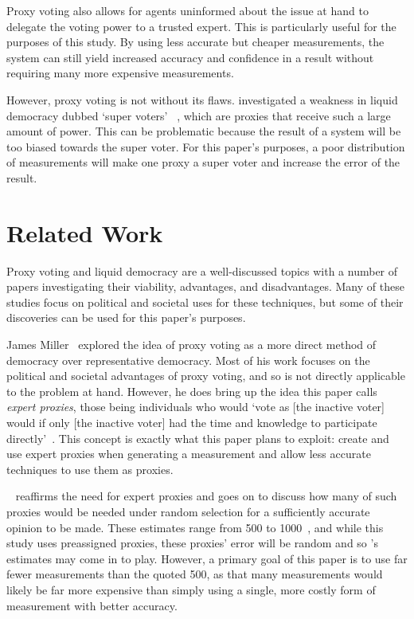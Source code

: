 Proxy voting also allows for agents uninformed about the issue at hand to
delegate the voting power to a trusted expert.
This is particularly useful for the purposes of this study.
By using less accurate but cheaper measurements, the system can still yield
increased accuracy and confidence in a result without requiring many more
expensive measurements.

However, proxy voting is not without its flaws.
 investigated a weakness in liquid democracy dubbed `super voters'
~\cite[para.~1.3]{Golz2021}, which are proxies that receive such a large amount
of power.
This can be problematic because the result of a system will be too biased
towards the super voter.
For this paper's purposes, a poor distribution of measurements will make one
proxy a super voter and increase the error of the result.




\section{Related Work}\label{sec:related-work}
Proxy voting and liquid democracy are a well-discussed topics with a number of
papers investigating their viability, advantages, and disadvantages.
Many of these studies focus on political and societal uses for these techniques,
but some of their discoveries can be used for this paper's purposes.

James Miller~\cite{Miller1969} explored the idea of proxy voting as a more
direct method of democracy over representative democracy.
Most of his work focuses on the political and societal advantages of proxy
voting, and so is not directly applicable to the problem at hand.
However, he does bring up the idea this paper calls \textit{expert proxies},
those being individuals who would `vote as [the inactive voter] would if only
[the inactive voter] had the time and knowledge to participate
directly'~\cite[para.~1.3]{Miller1969}.
This concept is exactly what this paper plans to exploit: create and use expert
proxies when generating a measurement and allow less accurate techniques to use
them as proxies.

~\cite{Mueller1972} reaffirms the need for expert proxies and
goes on to discuss how many of such proxies would be needed under random
selection for a sufficiently accurate opinion to be made.
These estimates range from 500 to 1000~\cite[para.~3.2]{Mueller1972}, and
while this study uses preassigned proxies, these proxies' error will be
random and so 's estimates may come in to play.
However, a primary goal of this paper is to use far fewer measurements than the
quoted 500, as that many measurements would likely be far more expensive than
simply using a single, more costly form of measurement with better accuracy.


